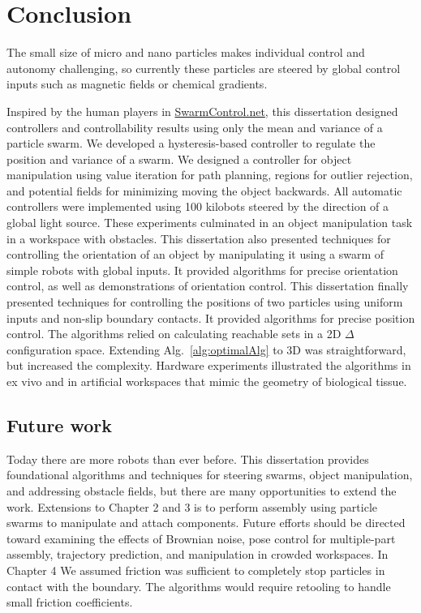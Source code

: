 
\chapter[Conclusion]{Conclusion}
\label{chap-conc}


  The small size of micro and nano particles makes individual control and autonomy challenging, so currently these particles are steered by global control inputs such as magnetic fields or chemical gradients.

Inspired by the human players in \href{www.swarmcontrol.net}{SwarmControl.net}, this dissertation designed controllers and controllability results using only the mean and variance of a particle swarm. 
We developed a hysteresis-based controller to regulate the position and variance of a swarm. We designed a controller for object manipulation using value iteration for path planning, regions for outlier rejection, and potential fields for minimizing moving the object backwards. 
All automatic controllers were implemented using 100 kilobots steered by the direction of a global light source.
These experiments culminated in an object manipulation task in a workspace with obstacles.
This dissertation also presented techniques for controlling the orientation of an object by manipulating it using a swarm of simple robots with global inputs.
It provided algorithms for precise orientation control, as well as demonstrations of orientation control. 
 This dissertation finally presented techniques for controlling the positions of two particles using uniform inputs and non-slip boundary contacts.  
 It provided algorithms for precise position control. The algorithms relied on calculating reachable sets in a 2D $\Delta$ configuration space.
 Extending Alg.~\ref{alg:optimalAlg}  to 3D was straightforward, but increased the complexity.
 Hardware experiments illustrated the algorithms in ex vivo and in artificial workspaces that mimic the geometry of biological tissue.
 
 \section{Future work}
 
 Today there are more robots than ever before.
 This dissertation provides foundational algorithms and techniques for steering swarms, object manipulation, and addressing obstacle fields, but there are many opportunities to extend the work.
 Extensions to Chapter 2 and 3 is to perform assembly using particle swarms to manipulate and attach components. Future efforts should be directed toward examining the effects of Brownian noise, pose control for multiple-part assembly, trajectory prediction, and manipulation in crowded workspaces.
 In Chapter 4 We assumed friction was sufficient to completely stop particles in contact with the boundary. 
  The algorithms would require retooling to handle small friction coefficients.
 
